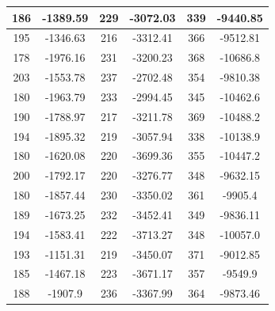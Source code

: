 \documentclass{article}
\begin{document}
\begin{tabular}{cccccc}
186&-1389.59&229&-3072.03&339&-9440.85 \\ \hline
195&-1346.63&216&-3312.41&366&-9512.81 \\ \hline
178&-1976.16&231&-3200.23&368&-10686.8 \\ \hline
203&-1553.78&237&-2702.48&354&-9810.38 \\ \hline
180&-1963.79&233&-2994.45&345&-10462.6 \\ \hline
190&-1788.97&217&-3211.78&369&-10488.2 \\ \hline
194&-1895.32&219&-3057.94&338&-10138.9 \\ \hline
180&-1620.08&220&-3699.36&355&-10447.2 \\ \hline
200&-1792.17&220&-3276.77&348&-9632.15 \\ \hline
180&-1857.44&230&-3350.02&361&-9905.4 \\ \hline
189&-1673.25&232&-3452.41&349&-9836.11 \\ \hline
194&-1583.41&222&-3713.27&348&-10057.0 \\ \hline
193&-1151.31&219&-3450.07&371&-9012.85 \\ \hline
185&-1467.18&223&-3671.17&357&-9549.9 \\ \hline
188&-1907.9&236&-3367.99&364&-9873.46 \\ \hline
\end{tabular}
\end{document}
